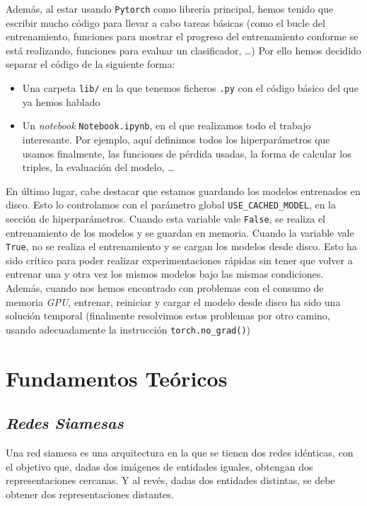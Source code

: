 \documentclass[11pt]{article}
\begin{document}
Además, al estar usando \lstinline{Pytorch} como librería principal, hemos tenido que escribir mucho código para llevar a cabo tareas básicas (como el bucle del entrenamiento, funciones para mostrar el progreso del entrenamiento conforme se está realizando, funciones para evaluar un clasificador, \ldots) Por ello hemos decidido separar el código de la siguiente forma:

\begin{itemize}
  \item Una carpeta \lstinline{lib/} en la que tenemos ficheros \lstinline{.py} con el código básico del que ya hemos hablado
  \item Un \emph{notebook} \lstinline{Notebook.ipynb}, en el que realizamos todo el trabajo interesante. Por ejemplo, aquí definimos todos los hiperparámetros que usamos finalmente, las funciones de pérdida usadas, la forma de calcular los triples, la evaluación del modelo, \ldots
\end{itemize}

En último lugar, cabe destacar que estamos guardando los modelos entrenados en disco. Esto lo controlamos con el parámetro global \lstinline{USE_CACHED_MODEL}, en la sección de hiperparámetros. Cuando esta variable vale \lstinline{False}, se realiza el entrenamiento de los modelos y se guardan en memoria. Cuando la variable vale \lstinline{True}, no se realiza el entrenamiento y se cargan los modelos desde disco. Esto ha sido crítico para poder realizar experimentaciones rápidas sin tener que volver a entrenar una y otra vez los mismos modelos bajo las mismas condiciones. Además, cuando nos hemos encontrado con problemas con el consumo de memoria \emph{GPU}, entrenar, reiniciar y cargar el modelo desde disco ha sido una solución temporal (finalmente resolvimos estos problemas por otro camino, usando adecuadamente la instrucción \lstinline{torch.no_grad()})

\pagebreak

\section{Fundamentos Teóricos}

\subsection {\emph{Redes Siamesas}}

Una red siamesa es una arquitectura en la que se tienen dos redes idénticas, con el objetivo que, dadas dos imágenes de entidades iguales, obtengan dos representaciones cercanas. Y al revés, dadas dos entidades distintas, se debe obtener dos representaciones distantes.
\end{document}
